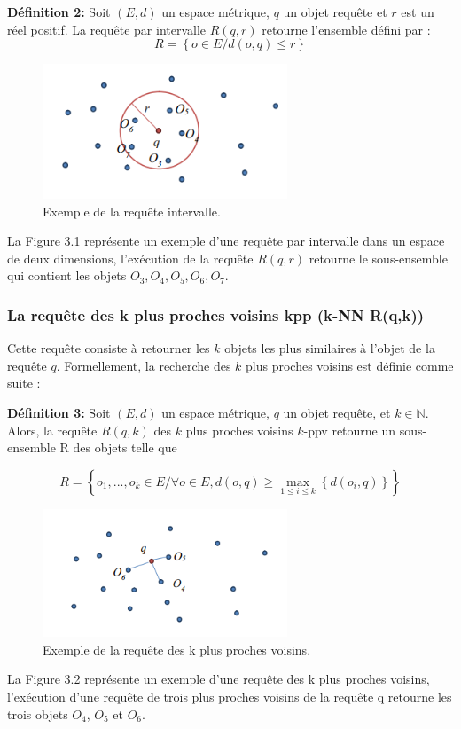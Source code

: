 \textbf{Définition 2:} Soit $ (E,d ) $ un espace métrique, $ q $ un objet requête et $ r $ est un réel  positif. La requête par intervalle $ R(q,r) $ retourne l’ensemble défini par :
\begin{equation}
	R = \left\{ o\in E / d(o, q) \leq r \right\}
\end{equation}

\begin{figure}[H]
	\centering
	\includegraphics[width=0.65\textwidth]{Figures/rangeQ} %
	\caption{Exemple de la requête intervalle.}
\end{figure}
La Figure 3.1 représente un exemple d’une requête par intervalle dans un espace de
deux dimensions, l’exécution de la requête $ R(q,r) $ retourne le sous-ensemble qui contient les objets $ {O_3,O_4,O_5,O_6,O_7} $.

\subsubsection{La requête des k plus proches voisins kpp (k-NN R(q,k))}
Cette requête consiste à retourner les $ k $ objets les plus similaires à l’objet de la requête $ q $. Formellement, la recherche des $ k $ plus proches voisins est définie comme suite :

\textbf{Définition 3:} Soit $ (E,d ) $ un espace métrique, $ q $ un objet requête, et $ k \in \mathbb{N} $. Alors, la requête  $ R(q,k) $ des $ k $ plus proches voisins $ k $-ppv retourne un sous-ensemble R des objets telle que

\begin{equation}
R = \left\{ o_1,...,o_k \in E / \forall o \in E, d(o, q) \ge \max_{1\leq i \leq k}\left\{d(o_i, q)\right\}  \right\}
\end{equation}

\begin{figure}[H]
	\centering
	\includegraphics[width=0.65\textwidth]{Figures/knnQ} %
	\caption{Exemple de la requête des k plus proches voisins.}
\end{figure}
La Figure 3.2 représente un exemple d’une requête des k plus proches voisins, l’exécution d’une requête de trois plus proches voisins de la requête q retourne les trois objets $ O_4 $, $ O_5 $ et $ O_6 $.

